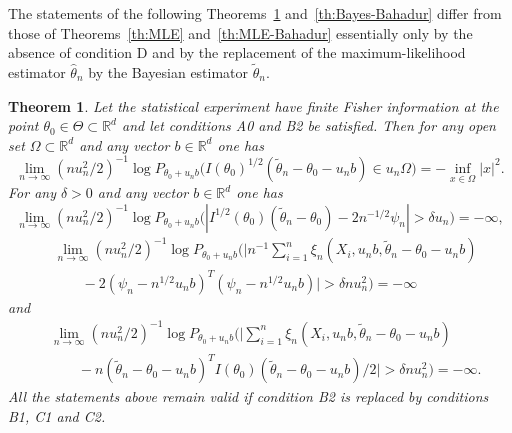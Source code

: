 \documentclass[11pt,a4paper]{article}
\newtheorem{theorem}{Theorem}[section]
\begin{document}
The statements of the following Theorems~\ref{th:Bayes} and~\ref{th:Bayes-Bahadur} differ from those of Theorems~\ref{th:MLE} and~\ref{th:MLE-Bahadur} essentially only by the absence of condition D and by the replacement of the maximum-likelihood estimator $\hat\theta_n$ by the Bayesian estimator $\tilde\theta_n$.

\begin{theorem}\label{th:Bayes}
Let the statistical experiment have finite Fisher information at the point $\theta_0\in\Theta\subset\mathbb{R}^d$ and let conditions A0 and B2 be satisfied. Then for any open set $\Omega\subset\mathbb{R}^d$ and any vector $b\in\mathbb{R}^d$ one has
\begin{equation}
\lim_{n\to\infty}(nu_n^2/2)^{-1}\log P_{\theta_0+u_nb}\bigl(I(\theta_0)^{1/2}(\tilde\theta_n-\theta_0-u_nb)\in u_n\Omega\bigr)=-\inf_{x\in\Omega}|x|^2.
\label{eq:33}
\end{equation}
For any $\delta>0$ and any vector $b\in\mathbb{R}^d$ one has
\begin{equation}
\lim_{n\to\infty}(nu_n^2/2)^{-1}\log P_{\theta_0+u_nb}\bigl(|I^{1/2}(\theta_0)(\tilde\theta_n-\theta_0)-2n^{-1/2}\psi_n|>\delta u_n\bigr)=-\infty,
\label{eq:34}
\end{equation}
\begin{equation}
\begin{aligned}
&\lim_{n\to\infty}(nu_n^2/2)^{-1}\log P_{\theta_0+u_nb}\Biggl(
\Biggl|n^{-1}\sum_{i=1}^n\xi_n(X_i,u_nb,\tilde\theta_n-\theta_0-u_nb)\\
&\qquad-2(\psi_n-n^{1/2}u_nb)^T(\psi_n-n^{1/2}u_nb)\Biggr|>\delta nu_n^2\Biggr)=-\infty
\end{aligned}
\label{eq:35}
\end{equation}
and
\begin{equation}
\begin{aligned}
&\lim_{n\to\infty}(nu_n^2/2)^{-1}\log P_{\theta_0+u_nb}\Biggl(
\Biggl|\sum_{i=1}^n\xi_n(X_i,u_nb,\tilde\theta_n-\theta_0-u_nb)\\
&\qquad-n(\tilde\theta_n-\theta_0-u_nb)^T I(\theta_0)(\tilde\theta_n-\theta_0-u_nb)/2\Biggr|>\delta nu_n^2\Biggr)=-\infty.
\end{aligned}
\label{eq:36}
\end{equation}
All the statements above remain valid if condition B2 is replaced by conditions B1, C1 and C2.
\end{theorem}
\end{document}
